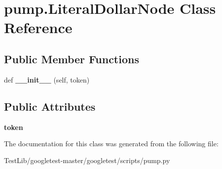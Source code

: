 \hypertarget{classpump_1_1LiteralDollarNode}{}\section{pump.\+Literal\+Dollar\+Node Class Reference}
\label{classpump_1_1LiteralDollarNode}
\subsection*{Public Member Functions}
\begin{DoxyCompactItemize}
\item 
\mbox{\label{classpump_1_1LiteralDollarNode_a181cccad8a48f7dfdd0716e427897e0b}} 
def {\bfseries \+\_\+\+\_\+init\+\_\+\+\_\+} (self, token)
\end{DoxyCompactItemize}
\subsection*{Public Attributes}
\begin{DoxyCompactItemize}
\item 
\mbox{\label{classpump_1_1LiteralDollarNode_ab4c6e209635b8868bcdf0fe8053431c6}} 
{\bfseries token}
\end{DoxyCompactItemize}


The documentation for this class was generated from the following file\+:\begin{DoxyCompactItemize}
\item 
Test\+Lib/googletest-\/master/googletest/scripts/pump.\+py\end{DoxyCompactItemize}
